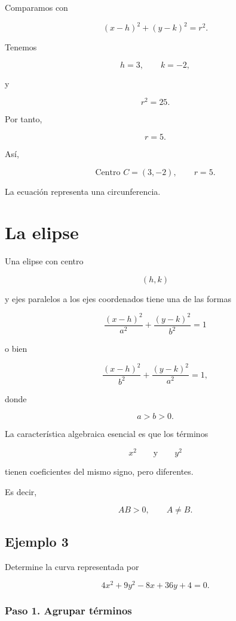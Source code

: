 \documentclass[12pt]{article}
\begin{document}
{Comparamos con

\[
(x-h)^2+(y-k)^2=r^2.
\]

Tenemos

\[
h=3,
\qquad
k=-2,
\]

y

\[
r^2=25.
\]

Por tanto,

\[
r=5.
\]

Así,

\[
\boxed{
\text{Centro }C=(3,-2),
\qquad
r=5.
}
\]

La ecuación representa una circunferencia.

\section{La elipse}

Una elipse con centro

\[
(h,k)
\]

y ejes paralelos a los ejes coordenados tiene una de las formas

\[
\boxed{
\frac{(x-h)^2}{a^2}
+
\frac{(y-k)^2}{b^2}
=1
}
\]

o bien

\[
\boxed{
\frac{(x-h)^2}{b^2}
+
\frac{(y-k)^2}{a^2}
=1,
}
\]

donde

\[
a>b>0.
\]

La característica algebraica esencial es que los términos

\[
x^2
\qquad\text{y}\qquad
y^2
\]

tienen coeficientes del mismo signo, pero diferentes.

Es decir,

\[
\boxed{
AB>0,
\qquad
A\neq B.
}
\]

\subsection{Ejemplo 3}

Determine la curva representada por

\[
4x^2+9y^2-8x+36y+4=0.
\]

\subsubsection*{Paso 1. Agrupar términos}

}
\end{document}
